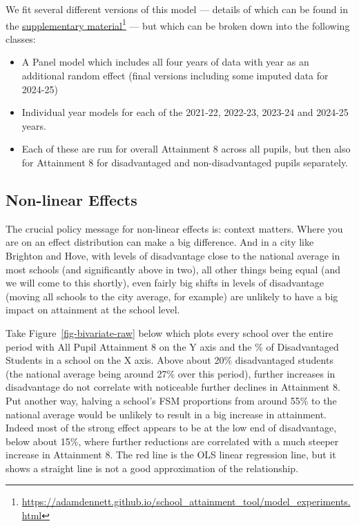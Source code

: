\documentclass[
  11pt,
]{article}
\providecommand{\tightlist}{%
  \setlength{\itemsep}{0pt}\setlength{\parskip}{0pt}}
\begin{document}
We fit several different versions of this model --- details of which can
be found in the
\href{https://adamdennett.github.io/school_attainment_tool/model_experiments.html}{supplementary
material}\footnote{\url{https://adamdennett.github.io/school_attainment_tool/model_experiments.html}}
--- but which can be broken down into the following classes:

\begin{itemize}
\tightlist
\item
  A Panel model which includes all four years of data with year as an
  additional random effect (final versions including some imputed data
  for 2024-25)
\item
  Individual year models for each of the 2021-22, 2022-23, 2023-24 and
  2024-25 years.
\item
  Each of these are run for overall Attainment 8 across all pupils, but
  then also for Attainment 8 for disadvantaged and non-disadvantaged
  pupils separately.
\end{itemize}

\subsection{Non-linear Effects}\label{non-linear-effects}

The crucial policy message for non-linear effects is: context matters.
Where you are on an effect distribution can make a big difference. And
in a city like Brighton and Hove, with levels of disadvantage close to
the national average in most schools (and significantly above in two),
all other things being equal (and we will come to this shortly), even
fairly big shifts in levels of disadvantage (moving all schools to the
city average, for example) are unlikely to have a big impact on
attainment at the school level.

Take Figure~\ref{fig-bivariate-raw} below which plots every school over
the entire period with All Pupil Attainment 8 on the Y axis and the \%
of Disadvantaged Students in a school on the X axis. Above about 20\%
disadvantaged students (the national average being around 27\% over this
period), further increases in disadvantage do not correlate with
noticeable further declines in Attainment 8. Put another way, halving a
school's FSM proportions from around 55\% to the national average would
be unlikely to result in a big increase in attainment. Indeed most of
the strong effect appears to be at the low end of disadvantage, below
about 15\%, where further reductions are correlated with a much steeper
increase in Attainment 8. The red line is the OLS linear regression
line, but it shows a straight line is not a good approximation of the
relationship.
\end{document}
